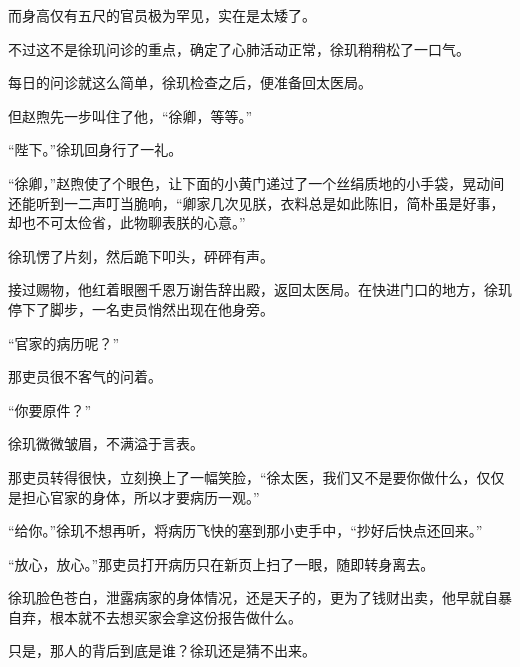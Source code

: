 而身高仅有五尺的官员极为罕见，实在是太矮了。

不过这不是徐玑问诊的重点，确定了心肺活动正常，徐玑稍稍松了一口气。

每日的问诊就这么简单，徐玑检查之后，便准备回太医局。

但赵煦先一步叫住了他，“徐卿，等等。”

“陛下。”徐玑回身行了一礼。

“徐卿，”赵煦使了个眼色，让下面的小黄门递过了一个丝绢质地的小手袋，晃动间还能听到一二声叮当脆响，“卿家几次见朕，衣料总是如此陈旧，简朴虽是好事，却也不可太俭省，此物聊表朕的心意。”

徐玑愣了片刻，然后跪下叩头，砰砰有声。

接过赐物，他红着眼圈千恩万谢告辞出殿，返回太医局。在快进门口的地方，徐玑停下了脚步，一名吏员悄然出现在他身旁。

“官家的病历呢？”

那吏员很不客气的问着。

“你要原件？”

徐玑微微皱眉，不满溢于言表。

那吏员转得很快，立刻换上了一幅笑脸，“徐太医，我们又不是要你做什么，仅仅是担心官家的身体，所以才要病历一观。”

“给你。”徐玑不想再听，将病历飞快的塞到那小吏手中，“抄好后快点还回来。”

“放心，放心。”那吏员打开病历只在新页上扫了一眼，随即转身离去。

徐玑脸色苍白，泄露病家的身体情况，还是天子的，更为了钱财出卖，他早就自暴自弃，根本就不去想买家会拿这份报告做什么。

只是，那人的背后到底是谁？徐玑还是猜不出来。
